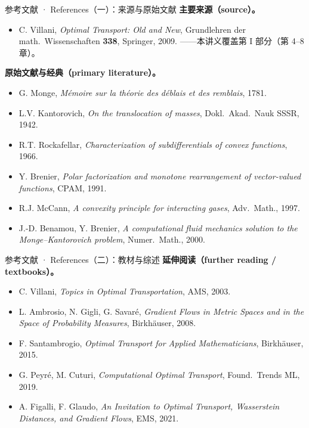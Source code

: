 \begin{frame}{参考文献 · References（一）：来源与原始文献}
  \textbf{主要来源（source）。}
  \begin{itemize}\small
    \item C. Villani, \emph{Optimal Transport: Old and New}, Grundlehren der math.\ Wissenschaften \textbf{338}, Springer, 2009. ——本讲义覆盖第 I 部分（第 4--8 章）。
  \end{itemize}
  \textbf{原始文献与经典（primary literature）。}
  \begin{itemize}\small
    \item G. Monge, \emph{Mémoire sur la théorie des déblais et des remblais}, 1781.
    \item L.V. Kantorovich, \emph{On the translocation of masses}, Dokl.\ Akad.\ Nauk SSSR, 1942.
    \item R.T. Rockafellar, \emph{Characterization of subdifferentials of convex functions}, 1966.
    \item Y. Brenier, \emph{Polar factorization and monotone rearrangement of vector-valued functions}, CPAM, 1991.
    \item R.J. McCann, \emph{A convexity principle for interacting gases}, Adv.\ Math., 1997.
    \item J.-D. Benamou, Y. Brenier, \emph{A computational fluid mechanics solution to the Monge--Kantorovich problem}, Numer.\ Math., 2000.
  \end{itemize}
\end{frame}

\begin{frame}{参考文献 · References（二）：教材与综述}
  \textbf{延伸阅读（further reading / textbooks）。}
  \begin{itemize}\small
    \item C. Villani, \emph{Topics in Optimal Transportation}, AMS, 2003.
    \item L. Ambrosio, N. Gigli, G. Savaré, \emph{Gradient Flows in Metric Spaces and in the Space of Probability Measures}, Birkhäuser, 2008.
    \item F. Santambrogio, \emph{Optimal Transport for Applied Mathematicians}, Birkhäuser, 2015.
    \item G. Peyré, M. Cuturi, \emph{Computational Optimal Transport}, Found.\ Trends ML, 2019.
    \item A. Figalli, F. Glaudo, \emph{An Invitation to Optimal Transport, Wasserstein Distances, and Gradient Flows}, EMS, 2021.
  \end{itemize}
\end{frame}


